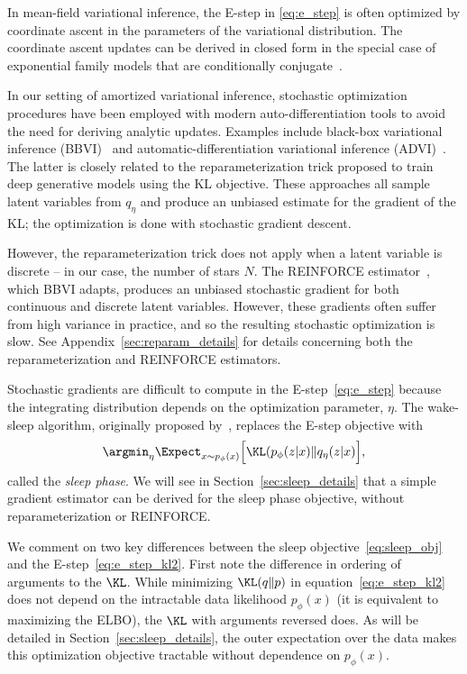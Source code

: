 In mean-field variational inference, the E-step in \eqref{eq:e_step} is often optimized by coordinate ascent in the parameters of the variational distribution. 
The coordinate ascent updates can be derived in closed form in the special case of exponential family models that are conditionally conjugate~\cite{Blei_2017_vi_review}. 

In our setting of amortized variational inference, stochastic 
optimization procedures have been employed with modern 
auto-differentiation tools to avoid the need for deriving 
analytic updates. Examples include black-box variational inference (BBVI)~\cite{ranganath2013black} 
and automatic-differentiation variational inference (ADVI)~\cite{kucukelbir2016automatic}. The latter 
is closely related to the reparameterization trick \cite{kingma2013autoencoding, rezende2014stochastic} proposed to train deep generative models using the KL objective. 
These approaches all sample latent variables from $q_\eta$ and produce an unbiased estimate 
for the gradient of the KL; the optimization is done with stochastic gradient descent. 

However, the reparameterization trick does not apply when a latent variable is discrete -- in our case, the number of stars $N$. The REINFORCE estimator~\cite{Williams1992reinforce}, which BBVI adapts, produces an unbiased stochastic gradient for both continuous and discrete latent variables. However, these gradients often suffer from high variance in practice, and so the resulting stochastic optimization is slow. See Appendix~\ref{sec:reparam_details} for details concerning both the reparameterization and REINFORCE estimators. 

Stochastic gradients are difficult to compute in the E-step~\eqref{eq:e_step} because the integrating distribution depends on the optimization parameter, $\eta$. 
The wake-sleep algorithm, originally proposed by~\cite{Hinton1995wake_sleep}, replaces the 
E-step objective with 
\begin{align}
    \argmin_{\eta} \Expect_{x \sim p_\phi(x)}\Big[\KL(p_\phi(z | x) \| q_\eta(z | x)\Big]
    \label{eq:sleep_obj},
\end{align}
called the {\itshape sleep phase}. We will see in Section~\ref{sec:sleep_details} that a simple gradient estimator can be derived for the sleep phase objective, without 
reparameterization or REINFORCE. 

We comment on two key differences between the sleep objective~\eqref{eq:sleep_obj} and the E-step~\eqref{eq:e_step_kl2}. First note the difference in ordering of arguments to the $\KL$. 
While minimizing $\KL(q\|p)$ in equation~\eqref{eq:e_step_kl2} does not depend on the intractable 
data likelihood $p_\phi(x)$ (it is equivalent to maximizing the ELBO), the $\KL$ with arguments reversed does. 
As will be detailed in Section~\ref{sec:sleep_details}, the outer expectation over the data makes this optimization objective tractable without dependence on $p_\phi(x)$. 

